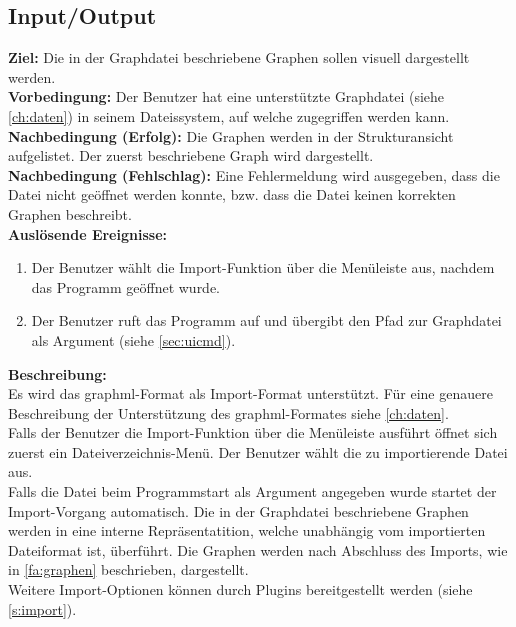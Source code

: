 \subsection{Input/Output}
\setcounter{fanr}{100}

\label{fa:import}
\textbf{Ziel:} Die in der Graphdatei beschriebene Graphen sollen visuell dargestellt werden.\\
\textbf{Vorbedingung:} Der Benutzer hat eine unterstützte Graphdatei (siehe \ref{ch:daten}) in seinem Dateissystem, auf welche zugegriffen werden kann.\\
\textbf{Nachbedingung (Erfolg):} Die Graphen werden in der Strukturansicht aufgelistet. Der zuerst beschriebene Graph wird dargestellt.\\
\textbf{Nachbedingung (Fehlschlag):}
Eine Fehlermeldung wird ausgegeben, dass die Datei nicht geöffnet werden konnte, bzw. dass die Datei keinen korrekten Graphen beschreibt.\\
\textbf{Auslösende Ereignisse:}
\begin{enumerate}[nolistsep, label=(\alph*)]
  \item Der Benutzer wählt die Import-Funktion über die Menüleiste aus, nachdem das Programm geöffnet wurde. %
  \item Der Benutzer ruft das Programm auf und übergibt den Pfad zur Graphdatei als Argument (siehe \ref{sec:uicmd}).
\end{enumerate}
\textbf{Beschreibung:}\\
Es wird das \gls{graphml}-Format als Import-Format unterstützt. Für eine genauere Beschreibung der Unterstützung des \gls{graphml}-Formates siehe \ref{ch:daten}.\\
Falls der Benutzer die Import-Funktion über die Menüleiste ausführt öffnet sich zuerst ein Dateiverzeichnis-Menü.
Der Benutzer wählt die zu importierende Datei aus.\\
Falls die Datei beim Programmstart als Argument angegeben wurde startet der Import-Vorgang automatisch.
Die in der Graphdatei beschriebene Graphen werden in eine interne Repräsentatition, welche unabhängig vom importierten Dateiformat ist, überführt.%
Die Graphen werden nach Abschluss des Imports, wie in \ref{fa:graphen} beschrieben, dargestellt.\\
Weitere Import-Optionen können durch Plugins bereitgestellt werden (siehe \ref{s:import}).

